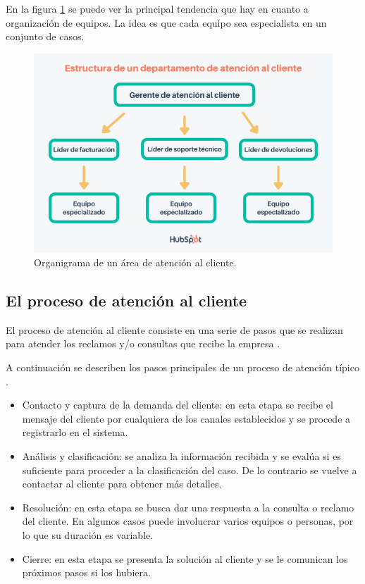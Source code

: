 En la figura \ref{fig:atencionestructura} se puede ver la principal tendencia que hay en cuanto a organización de equipos. La idea es que cada equipo sea especialista en un conjunto de casos.

\begin{figure}[htbp]
	\centering
	\includegraphics[width=.8\textwidth]{./Figures/atencionclienteestructura.png}
	\caption{Organigrama de un área de atención al cliente\protect\footnotemark.}
	\label{fig:atencionestructura}
\end{figure}


\subsection{El proceso de atención al cliente}

El proceso de atención al cliente consiste en una serie de pasos que se realizan para atender los reclamos y/o consultas que recibe la empresa \citep{WEBSITE:7}.

A continuación se describen los pasos principales de un proceso de atención típico \citep{WEBSITE:8}.

\begin{itemize}

\item Contacto y captura de la demanda del cliente: en esta etapa se recibe el mensaje del cliente por cualquiera de los canales establecidos y se procede a registrarlo en el sistema.
\item Análisis y clasificación: se analiza la información recibida y se evalúa si es suficiente para proceder a la clasificación del caso. De lo contrario se vuelve a contactar al cliente para obtener más detalles.
\item Resolución: en esta etapa se busca dar una respuesta a la consulta o reclamo del cliente. En algunos casos puede involucrar varios equipos o personas, por lo que su duración es variable.
\item Cierre: en esta etapa se presenta la solución al cliente y se le comunican los próximos pasos si los hubiera.

\end{itemize}

